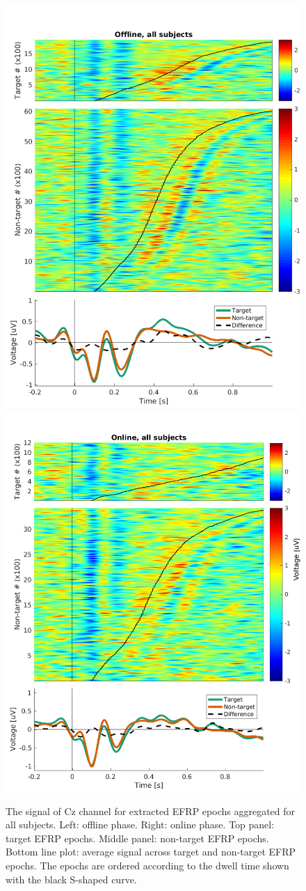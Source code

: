 \documentclass[12pt]{iopart}
\begin{document}
\begin{figure}[h]
\center
    \includegraphics[trim={0cm 0cm 1.5cm 0cm},clip,height=0.65\columnwidth]{../images/Epochs_Offline_chCz_allsubjects.pdf}%
    \includegraphics[trim={0cm 0cm 0cm 0cm},clip,height=0.65\columnwidth]{../images/Epochs_Online_chCz_allsubjects.pdf}%
    \caption{The signal of Cz channel for extracted EFRP epochs aggregated
        for all subjects.
        Left: offline phase. Right: online phase.
        Top panel: target EFRP epochs. Middle panel: non-target EFRP epochs.
        Bottom line plot: average signal across target and non-target EFRP epochs.
        The epochs are ordered according to the dwell time
        shown with the black S-shaped curve.
    }


\end{figure}
\end{document}
